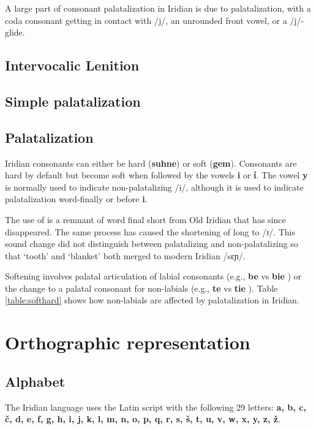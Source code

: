 A large part of consonant palatalization in Iridian is due to palatalization, with a coda consonant getting in contact with /j/, an unrounded front vowel, or a /j/-glide.

\subsection{Intervocalic Lenition}


\subsection{Simple palatalization}

\subsection{Palatalization}
\par Iridian consonants can either be hard (\textbf{suhne}) or soft (\textbf{gem}). Consonants are hard by default but become soft when followed by the vowels \textbf{i} or \textbf{í}. The vowel \textbf{y} is normally used to indicate non-palatalizing /i/, although it is used to indicate palatalization word-finally or before \textbf{i}.

\par The use of  is a remnant of word final short  from Old Iridian that has since disappeared. The same process has caused the shortening of long  to /ɪ/. This sound change did not distinguish between palatalizing and non-palatalizing  so that  `tooth' and  `blanket' both merged to modern Iridian  /sɛɲ/.

\par Softening involves palatal articulation of labial consonants (e.g., \textbf{be} \textipa{[bE]} vs \textbf{bie} \textipa{[b\sx{j}E]}) or the change to a palatal consonant for non-labials (e.g., \textbf{te} \textipa{[tE]} vs \textbf{tie} \textipa{[cE]}). Table \ref{table:softhard} shows how non-labials are affected by palatalization in Iridian.

\section{Orthographic representation}
\subsection{Alphabet}

\par The Iridian language uses the Latin script with the following 29 letters: \textbf{a, b, c, č, d, e, f, g, h, i, j, k, l, m, n, o, p, q, r, s, š, t, u, v, w, x, y, z, ž}.

